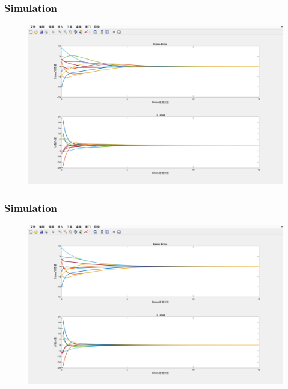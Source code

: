 \documentclass{beamer}
\begin{document}
\begin{frame}
\frametitle{Simulation}
\begin{figure}[htbp]
    \includegraphics[width=12cm]{figures/Result3-Fig5c.png}
\end{figure}

\end{frame}
\begin{frame}
\frametitle{Simulation}
\begin{figure}[htbp]
    \includegraphics[width=12cm]{figures/Result4-Fig5d.png}
\end{figure}

\end{frame}
\end{document}
